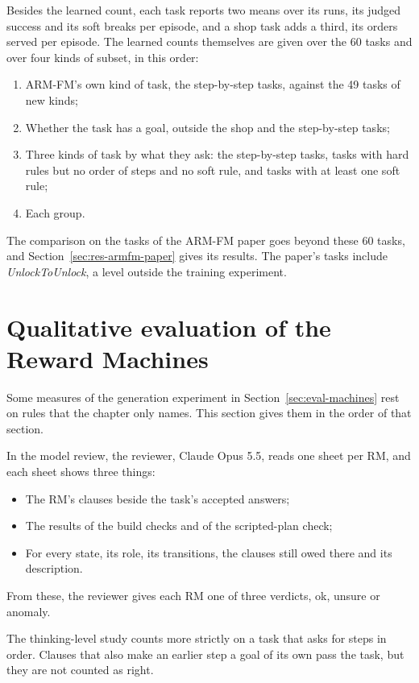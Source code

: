 \documentclass[11pt,english,listoffigures,listoftables]{tfgetsinf}
\newcommand{\env}[1]{\textsf{\slshape #1}}  %
\begin{document}
Besides the learned count, each task reports two means over its runs, its judged success and its soft breaks per episode, and a shop task adds a third, its orders served per episode. The learned counts themselves are given over the 60 tasks and over four kinds of subset, in this order:
\begin{enumerate}
    \item ARM-FM's own kind of task, the step-by-step tasks, against the 49 tasks of new kinds;
    \item Whether the task has a goal, outside the shop and the step-by-step tasks;
    \item Three kinds of task by what they ask: the step-by-step tasks, tasks with hard rules but no order of steps and no soft rule, and tasks with at least one soft rule;
    \item Each group.
\end{enumerate}

The comparison on the tasks of the ARM-FM paper goes beyond these 60 tasks, and Section~\ref{sec:res-armfm-paper} gives its results. The paper's tasks include \env{UnlockToUnlock}, a level outside the training experiment.

\section{Qualitative evaluation of the Reward Machines}
\label{app:eval-machines}
Some measures of the generation experiment in Section~\ref{sec:eval-machines} rest on rules that the chapter only names. This section gives them in the order of that section.

In the model review, the reviewer, Claude Opus 5.5, reads one sheet per RM, and each sheet shows three things:
\begin{itemize}
    \item The RM's clauses beside the task's accepted answers;
    \item The results of the build checks and of the scripted-plan check;
    \item For every state, its role, its transitions, the clauses still owed there and its description.
\end{itemize}
\noindent From these, the reviewer gives each RM one of three verdicts, ok, unsure or anomaly.

The thinking-level study counts more strictly on a task that asks for steps in order. Clauses that also make an earlier step a goal of its own pass the task, but they are not counted as right.
\end{document}
